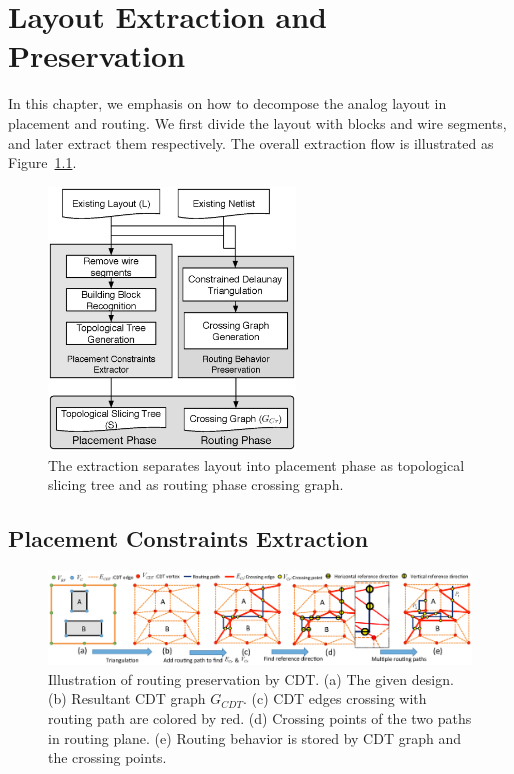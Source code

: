 
\chapter{Layout Extraction and Preservation}\label{chap:LayoutExtPre}

  In this chapter, we emphasis on how to decompose the analog layout in placement and routing. We first divide the layout with blocks and wire segments, and later extract them respectively. The overall extraction flow is illustrated as Figure~\ref{fig:ExtractFlow}. 

  \begin{figure}[t]
    \centering
    \includegraphics[height=7cm]{Fig/ExtractFlow.eps}
    \caption{The extraction separates layout into placement phase as topological slicing tree and as routing phase crossing graph.}
    \label{fig:ExtractFlow}
  \end{figure}


  \section{Placement Constraints Extraction}\label{sec:PlExtract}

    \begin{figure}[t]
      \begin{center}
      \includegraphics[width=\textwidth]{Fig/CGC.eps}
      \caption{Illustration of routing preservation by CDT. 
        (a) The given design.
        (b) Resultant CDT graph $G_{CDT}$.
        (c) CDT edges crossing with routing path are colored by red.
        (d) Crossing points of the two paths in routing plane.
        (e) Routing behavior is stored by CDT graph and the crossing points.}
      \label{fig:CGC}
      \end{center}
    \end{figure}

